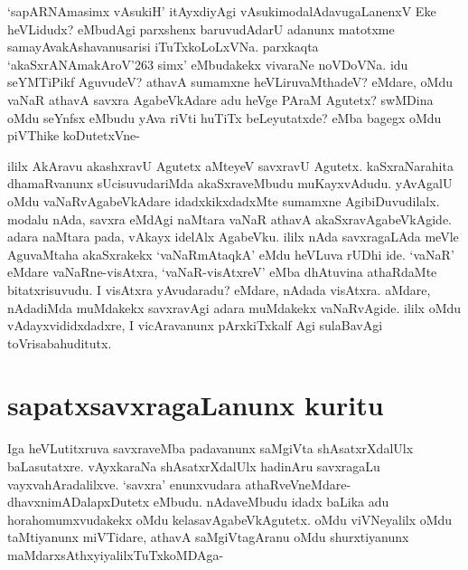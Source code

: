 `sapARNAmasimx vAsukiH'\label{95a} itAyxdiyAgi vAsukimodalAdavugaLanenxV Eke heVLidudx? eMbudAgi parxshenx baruvudAdarU adanunx matotxme samayAvakAshavanusarisi iTuTxkoLoLxVNa. parxkaqta `akaSxrANAmakAroV\char'263 simx' eMbudakekx vivaraNe noVDoVNa. idu seYMTiPikf AguvudeV? athavA sumamxne heVLiruvaMthadeV? eMdare, oMdu vaNaR athavA savxra AgabeVkAdare adu heVge PAraM Agutetx? swMDina oMdu seYnfsx eMbudu yAva riVti huTiTx beLeyutatxde? eMba bagegx oMdu piVThike koDutetxVne-

ililx AkAravu akashxravU Agutetx aMteyeV savxravU Agutetx. kaSxraNarahita dhamaRvanunx sUcisuvudariMda akaSxraveMbudu muKayxvAdudu. yAvAgalU oMdu vaNaRvAgabeVkAdare idadxkikxdadxMte sumamxne AgibiDuvudilalx. modalu nAda, savxra eMdAgi naMtara vaNaR athavA akaSxravAgabeVkAgide. adara naMtara pada, vAkayx idelAlx AgabeVku. ililx nAda savxragaLAda meVle AguvaMtaha akaSxrakekx `vaNaRmAtaqkA' eMdu heVLuva rUDhi ide. `vaNaR' eMdare vaNaRne-visAtxra, `vaNaR-visAtxreV' eMba dhAtuvina athaRdaMte bitatxrisuvudu. I visAtxra yAvudaradu? eMdare, nAdada visAtxra. aMdare, nAdadiMda muMdakekx savxravAgi adara muMdakekx vaNaRvAgide. ililx oMdu vAdayxvididxdadxre, I vicAravanunx pArxkiTxkalf Agi sulaBavAgi toVrisabahuditutx.

\section*{sapatxsavxragaLanunx kuritu}

Iga heVLutitxruva savxraveMba padavanunx saMgiVta shAsatxrXdalUlx baLasutatxre. vAyxkaraNa shAsatxrXdalUlx hadinAru savxragaLu vayxvahAradalilxve. `savxra' enunxvudara athaRveVneMdare-dhavxnimADalapxDutetx eMbudu. nAdaveMbudu idadx baLika adu horahomumxvudakekx oMdu kelasavAgabeVkAgutetx. oMdu viVNeyalilx oMdu taMtiyanunx miVTidare, athavA saMgiVtagAranu oMdu shurxtiyanunx maMdarxsAthxyiyalilxTuTxkoMDAga-

